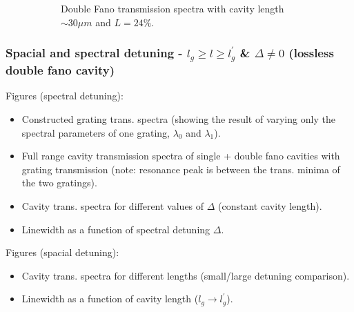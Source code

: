 \begin{figure}[h!]
\begin{subfigure}[c]{0.34\textwidth}
        \caption{Double Fano transmission spectra with cavity length $\sim 30 \mu m$ and $L = 24\%$.}
    \end{subfigure}
    \caption{}
    \label{fig:HWHM_vs_losses_whole_figure}
\end{figure}


\subsubsection{Spacial and spectral detuning - $l_{g} \geq l \geq l_{g}^{\prime}$ \& $\Delta \neq 0$ (lossless double fano cavity)}

Figures (spectral detuning): 
\begin{itemize}
    \item Constructed grating trans. spectra (showing the result of varying only the spectral parameters of one grating, $\lambda_0$ and $\lambda_1$).
    \item Full range cavity transmission spectra of single + double fano cavities with grating transmission (note: resonance peak is between the trans. minima of the two gratings).
    \item Cavity trans. spectra for different values of $\Delta$ (constant cavity length).
    \item Linewidth as a function of spectral detuning $\Delta$.
\end{itemize}

Figures (spacial detuning):
\begin{itemize}
    \item Cavity trans. spectra for different lengths (small/large detuning comparison).
    \item Linewidth as a function of cavity length ($l_g \rightarrow l_g^{\prime}$).
\end{itemize}


